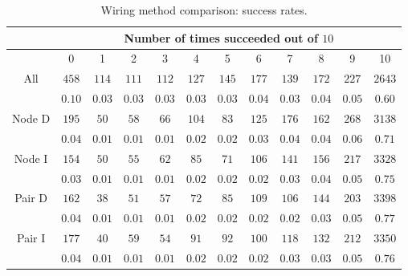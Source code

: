 \begin{table}[H]
\begin{center}
\begin{singlespace}
\begin{tabular}{|c||c|c|c|c|c|c|c|c|c|c|c|}
\hline
 & \multicolumn{11}{|c|}{Number of times succeeded out of $10$} \\
\hline
 & 0 & 1 & 2 & 3 & 4 & 5 & 6 & 7 & 8 & 9 & 10 \\
\hline\hline
All & $458$ & $114$ & $111$ & $112$ & $127$ & $145$ & $177$ & $139$ & $172$ & $227$ & $2643$ \\
 & $0.10$ & $0.03$ & $0.03$ & $0.03$ & $0.03$ & $0.03$ & $0.04$ & $0.03$ & $0.04$ & $0.05$ & $0.60$ \\
\hline
 Node D & $195$ & $50$ & $58$ & $66$ & $104$ & $83$ & $125$ & $176$ & $162$ & $268$ & $3138$ \\
  & $0.04$ & $0.01$ & $0.01$ & $0.01$ & $0.02$ & $0.02$ & $0.03$ & $0.04$ & $0.04$ & $0.06$ & $0.71$ \\
\hline
  Node I & $154$ & $50$ & $55$ & $62$ & $85$ & $71$ & $106$ & $141$ & $156$ & $217$ & $3328$ \\
   & $0.03$ & $0.01$ & $0.01$ & $0.01$ & $0.02$ & $0.02$ & $0.02$ & $0.03$ & $0.04$ & $0.05$ & $0.75$ \\
\hline
   Pair D & $162$ & $38$ & $51$ & $57$ & $72$ & $85$ & $109$ & $106$ & $144$ & $203$ & $3398$ \\
    & $0.04$ & $0.01$ & $0.01$ & $0.01$ & $0.02$ & $0.02$ & $0.02$ & $0.02$ & $0.03$ & $0.05$ & $0.77$ \\
\hline
    Pair I & $177$ & $40$ & $59$ & $54$ & $91$ & $92$ & $100$ & $118$ & $132$ & $212$ & $3350$ \\
     & $0.04$ & $0.01$ & $0.01$ & $0.01$ & $0.02$ & $0.02$ & $0.02$ & $0.03$ & $0.03$ & $0.05$ & $0.76$ \\
\hline
\end{tabular}
\end{singlespace}
\end{center}
\label{tb:wiring_success}
\caption{Wiring method comparison: success rates.}
\end{table}

